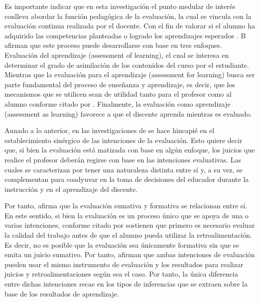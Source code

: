 \documentclass[spanish]{textolivre}
\begin{document}
Es importante indicar que en esta investigación el punto medular de interés conlleva abordar la función pedagógica de la evaluación, la cual se vincula con la evaluación continua realizada por el docente. Con el fin de valorar si el alumno ha adquirido las competencias planteadas o logrado los aprendizajes esperados \cite{inee2019}. %
\textcite{black2018}B %
afirman que este proceso puede desarrollarse con base en tres enfoques. Evaluación del aprendizaje (assessment of learning), el cual se interesa en determinar el grado de asimilación de los contenidos del curso por el estudiante. Mientras que la evaluación para el aprendizaje (assessment for learning) busca ser parte fundamental del proceso de enseñanza y aprendizaje, es decir, que los mecanismos que se utilicen sean de utilidad tanto para el profesor como al alumno \textcite{scriven1967} %
conforme citado por \textcite{taras2005}. Finalmente, la evaluación como aprendizaje (assessment as learning) favorece a que el discente aprenda mientras es evaluado.

Aunado a lo anterior, en las investigaciones de \textcite{taras2005,taras2008,lau2016} %
se hace hincapié en el establecimiento sinérgico de las intenciones de la evaluación. Esto quiere decir que, si bien la evaluación está matizada con base en algún enfoque, los juicios que realice el profesor deberán regirse con base en las intenciones evaluativas. Las cuales se caracterizan por tener una naturaleza distinta entre sí y, a su vez, se complementan para coadyuvar en la toma de decisiones del educador durante la instrucción y en el aprendizaje del discente.

Por tanto, \textcite{taras2005} afirma que la evaluación sumativa y formativa se relacionan entre sí. En este sentido, si bien la evaluación es un proceso único que se apoya de una o varias intenciones, \textcite{taras2005,sadler1989} conforme citado por \textcite{taras2005} sostienen que primero es necesario evaluar la calidad del trabajo antes de que el alumno pueda utilizar la retroalimentación. Es decir, no es posible que la evaluación sea únicamente formativa sin que se emita un juicio sumativo. Por tanto, \textcite{black2018} afirman que ambas intenciones de evaluación pueden usar el mismo instrumento de evaluación y los resultados para realizar juicios y retroalimentaciones según sea el caso. Por tanto, la única diferencia entre dichas intenciones recae en los tipos de inferencias que se extraen sobre la base de los resultados de aprendizaje.
\end{document}
